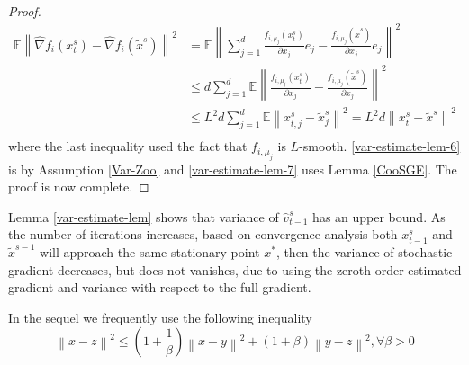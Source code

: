 \documentclass{article}
\newcommand*{\E}{\mathbb{E}}
\newcommand{\norm}[1]{\left\lVert#1\right\rVert}
\theoremstyle{definition}
\theoremstyle{remark}
\begin{document}
\begin{proof}
\begin{equation}
 \begin{split}
 \E \norm{\hat{\nabla} f_i(x_{t}^s)-\hat{\nabla} f_i(\tilde{x}^s)}^2 &= \E \norm{ \sum_{j=1}^d\frac{f_{i,\mu_j}(x_{t}^s)}{\partial x_j}e_j-\frac{f_{i,\mu_j}(\tilde{x}^s)}{\partial x_j}e_j}^2\\
 &\leq d \sum_{j=1}^d \E \norm{ \frac{f_{i,\mu_j}(x_{t}^s)}{\partial x_j}-\frac{f_{i,\mu_j}(\tilde{x}^s)}{\partial x_j}}^2\\
 &\leq L^2 d \sum_{j=1}^d \E \norm{x_{t,j}^s-\tilde{x}_{j}^s}^2 = L^2 d \norm{x_{t}^s-\tilde{x}^s}^2\\
 \end{split}
 \end{equation}
  where the last inequality used the fact that $f_{i,\mu_j}$ is $L$-smooth. \eqref{var-estimate-lem-6} is by Assumption \ref{Var-Zoo} and \eqref{var-estimate-lem-7} uses Lemma \ref{CooSGE}. The proof is now complete.
\end{proof}
{\color{Green}
Lemma \ref{var-estimate-lem} shows that variance of $\hat{v}_{t-1}^s$ has an upper bound. As the number of iterations increases, based on convergence analysis both $x_{t-1}^s$ and $\widetilde{x}^{s-1}$ will approach the same stationary point $x^*$, then the
variance of stochastic gradient decreases, but does not vanishes, due to using the zeroth-order estimated gradient and variance with respect to the full gradient.
}

In the sequel we frequently use the following inequality
\begin{equation}\label{young}
\norm{x-z}^2 \leq (1+\frac{1}{\beta})\norm{x-y}^2 + (1+\beta) \norm{{y-z}}^2, \forall \beta> 0
\end{equation}
\end{document}
